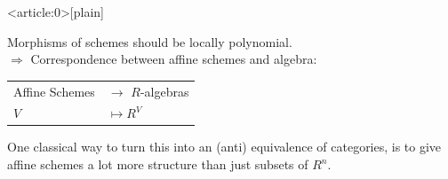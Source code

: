 \documentclass{beamer}
\begin{document}
{ %
    \begin{frame}<article:0>[plain]
     \end{frame}
}

\begin{frame}
  Morphisms of schemes should be locally polynomial. \\
  \pause
  $\Rightarrow$ Correspondence between affine schemes and algebra: \\
  \pause
  \begin{center}
    \begin{tabular}{ll}
      Affine Schemes & $\to$ $R$-algebras \\
      $V$ & $\mapsto R^V$
    \end{tabular}
  \end{center}
  \pause
  One classical way to turn this into an (anti) equivalence of categories,
  is to give affine schemes a lot more structure than just subsets of $R^n$.
\end{frame}
\end{document}

